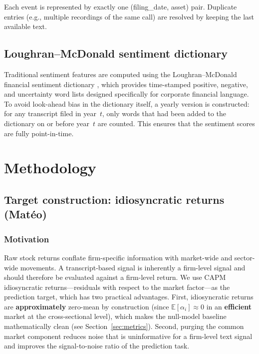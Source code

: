 \documentclass{article}
\begin{document}
Each event is represented by exactly one (filing\_date, asset) pair. Duplicate entries (e.g., multiple recordings of the same call) are resolved by keeping the last available text.


\subsection{Loughran--McDonald sentiment dictionary}

Traditional sentiment features are computed using the Loughran--McDonald financial sentiment dictionary \cite{lm2011}, which provides time-stamped positive, negative, and uncertainty word lists designed specifically for corporate financial language. To avoid look-ahead bias in the dictionary itself, a yearly version is constructed: for any transcript filed in year~$t$, only words that had been added to the dictionary on or before year~$t$ are counted. This ensures that the sentiment scores are fully point-in-time.


\section{Methodology}

\subsection{Target construction: idiosyncratic returns (Matéo)}

\subsubsection{Motivation}

Raw stock returns conflate firm-specific information with market-wide and sector-wide movements. A transcript-based signal is inherently a firm-level signal and should therefore be evaluated against a firm-level return. We use CAPM idiosyncratic returns---residuals with respect to the market factor---as the prediction target, which has two practical advantages. First, idiosyncratic returns are \textbf{approximately} zero-mean by construction (since $\mathbb{E}[\alpha_i] \approx 0$ in an \textbf{efficient} market at the cross-sectional level), which makes the null-model baseline mathematically clean (see Section~\ref{sec:metrics}). Second, purging the common market component reduces noise that is uninformative for a firm-level text signal and improves the signal-to-noise ratio of the prediction task.
\end{document}
